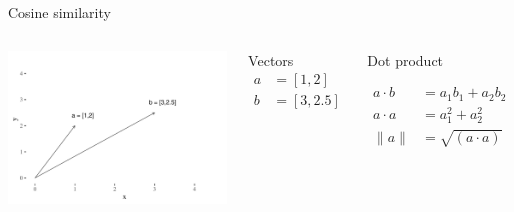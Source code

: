 \documentclass[
  10pt,
  ignorenonframetext,
  x11names, dvipsnames, bibspacing,natbib, table]{beamer}
\begin{document}
\begin{frame}{Cosine similarity}
\protect\hypertarget{cosine-similarity}{}
\begin{columns}
    

\begin{center}\includegraphics[width=1\linewidth]{presentationBoston_files/figure-beamer/cosine1-1} \end{center}



\footnotesize 

\begin{block}{Vectors}
\begin{align*}
a  & = [1,2]\\
b  &= [3,2.5]
\end{align*}

\end{block}
\pause 

\begin{block}{Dot product}


\begin{align*}
a \cdot b & = a_1 b_1 + a_2 b_2\\
a \cdot a & = a_1^2 + a_2 ^ 2 \\
\lVert a\rVert & = \sqrt{(a \cdot a)}
\end{align*}

\end{block}



\end{columns}
\end{frame}
\end{document}
